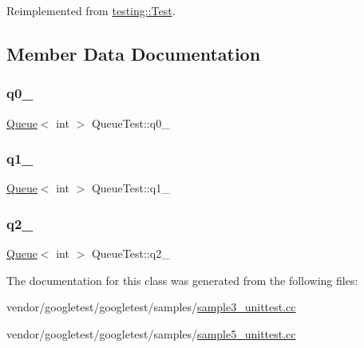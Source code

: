 Reimplemented from \hyperlink{classtesting_1_1_test_a190315150c303ddf801313fd1a777733}{testing\+::\+Test}.



\subsection{Member Data Documentation}
\mbox{\label{class_queue_test_a0eba1fe2b31d75abd2df688ca5245e22}} 
\subsubsection{\texorpdfstring{q0\+\_\+}{q0\_}}
{\footnotesize\ttfamily \hyperlink{class_queue}{Queue}$<$ int $>$ Queue\+Test\+::q0\+\_\+\hspace{0.3cm}{\ttfamily [protected]}}

\mbox{\label{class_queue_test_a1e55594e71820ba0f1b09591fb328c30}} 
\subsubsection{\texorpdfstring{q1\+\_\+}{q1\_}}
{\footnotesize\ttfamily \hyperlink{class_queue}{Queue}$<$ int $>$ Queue\+Test\+::q1\+\_\+\hspace{0.3cm}{\ttfamily [protected]}}

\mbox{\label{class_queue_test_aeb7a2e3f6ce2d97d84eb1e01468adc2f}} 
\subsubsection{\texorpdfstring{q2\+\_\+}{q2\_}}
{\footnotesize\ttfamily \hyperlink{class_queue}{Queue}$<$ int $>$ Queue\+Test\+::q2\+\_\+\hspace{0.3cm}{\ttfamily [protected]}}



The documentation for this class was generated from the following files\+:\begin{DoxyCompactItemize}
\item 
vendor/googletest/googletest/samples/\hyperlink{sample3__unittest_8cc}{sample3\+\_\+unittest.\+cc}\item 
vendor/googletest/googletest/samples/\hyperlink{sample5__unittest_8cc}{sample5\+\_\+unittest.\+cc}\end{DoxyCompactItemize}
